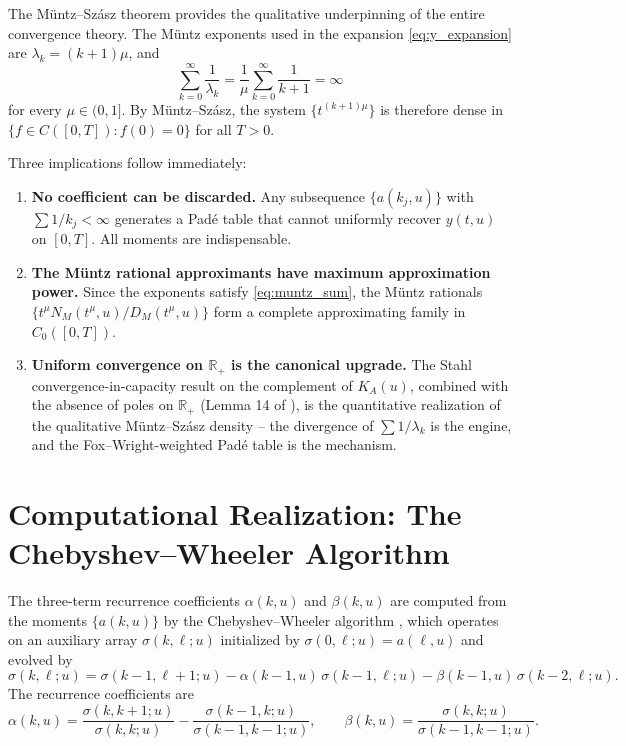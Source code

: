 \documentclass{article}
\newcommand{\R}{\mathbb{R}}
\begin{document}
The Müntz--Szász theorem \cite{MuntzSzasz1914,Moragues2018} provides the
qualitative underpinning of the entire convergence theory. The Müntz
exponents used in the expansion \eqref{eq:y_expansion} are $\lambda_k =
(k+1)\mu$, and
\begin{equation}\label{eq:muntz_sum}
  \sum_{k=0}^\infty \frac{1}{\lambda_k} = \frac{1}{\mu}\sum_{k=0}^\infty \frac{1}{k+1} = \infty
\end{equation}
for every $\mu \in (0,1]$. By Müntz--Szász, the system $\{t^{(k+1)\mu}\}$
is therefore dense in $\{f \in C([0,T]) : f(0) = 0\}$ for all $T > 0$.

Three implications follow immediately:

\begin{enumerate}
\item \textbf{No coefficient can be discarded.} Any subsequence
  $\{a(k_j, u)\}$ with $\sum 1/k_j < \infty$ generates a Padé table that
  cannot uniformly recover $y(t,u)$ on $[0,T]$. All moments are
  indispensable.

\item \textbf{The Müntz rational approximants have maximum approximation power.}
  Since the exponents satisfy \eqref{eq:muntz_sum}, the Müntz rationals
  $\{t^\mu N_M(t^\mu, u)/D_M(t^\mu, u)\}$ form a complete approximating
  family in $C_0([0,T])$.

\item \textbf{Uniform convergence on $\R_+$ is the canonical upgrade.}
  The Stahl convergence-in-capacity result on the complement of $K_A(u)$,
  combined with the absence of poles on $\R_+$ (Lemma 14 of
  \cite{Crowley2026}), is the quantitative realization of the qualitative
  Müntz--Szász density -- the divergence of $\sum 1/\lambda_k$ is the
  engine, and the Fox--Wright-weighted Padé table is the mechanism.
\end{enumerate}

\section{Computational Realization: The Chebyshev--Wheeler Algorithm}

The three-term recurrence coefficients $\alpha(k,u)$ and $\beta(k,u)$ are
computed from the moments $\{a(k,u)\}$ by the Chebyshev--Wheeler algorithm
\cite{Wheeler1974,Gautschi1982}, which operates on an auxiliary array
$\sigma(k,\ell;u)$ initialized by $\sigma(0,\ell;u) = a(\ell,u)$ and
evolved by
\begin{equation}\label{eq:sigma_rec}
  \sigma(k,\ell;u) = \sigma(k-1,\ell+1;u) - \alpha(k-1,u)\,\sigma(k-1,\ell;u)
    - \beta(k-1,u)\,\sigma(k-2,\ell;u).
\end{equation}
The recurrence coefficients are
\begin{equation}\label{eq:alpha_beta_wheeler}
  \alpha(k,u) = \frac{\sigma(k,k+1;u)}{\sigma(k,k;u)}
    - \frac{\sigma(k-1,k;u)}{\sigma(k-1,k-1;u)},
  \qquad
  \beta(k,u) = \frac{\sigma(k,k;u)}{\sigma(k-1,k-1;u)}.
\end{equation}
\end{document}
